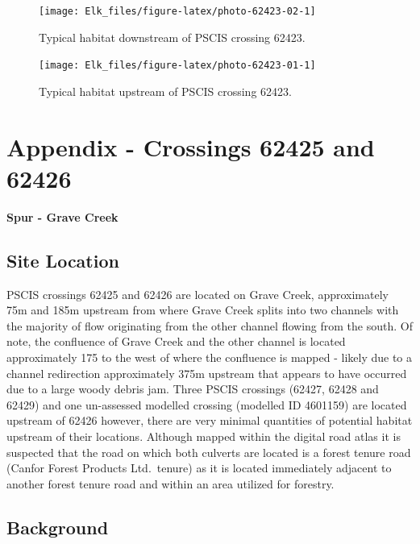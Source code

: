 \documentclass[
]{book}
\begin{document}
\begin{figure}[!ht]
\texttt{[image: Elk\_files/figure-latex/photo-62423-02-1]} \caption{Typical habitat downstream of PSCIS crossing 62423.}\label{fig:photo-62423-02}
\end{figure}

\begin{figure}[!ht]
\texttt{[image: Elk\_files/figure-latex/photo-62423-01-1]} \caption{Typical habitat upstream of PSCIS crossing 62423.}\label{fig:photo-62423-01}
\end{figure}

\hypertarget{appendix---crossings-62425-and-62426}{%
\chapter*{Appendix - Crossings 62425 and 62426}\label{appendix---crossings-62425-and-62426}}

\textbf{Spur - Grave Creek}

\hypertarget{site-location-4}{%
\section*{Site Location}\label{site-location-4}}

PSCIS crossings 62425 and 62426 are located on Grave Creek, approximately 75m and 185m upstream from where Grave Creek splits into two channels with the majority of flow originating from the other channel flowing from the south. Of note, the confluence of Grave Creek and the other channel is located approximately 175 to the west of where the confluence is mapped - likely due to a channel redirection approximately 375m upstream that appears to have occurred due to a large woody debris jam. Three PSCIS crossings (62427, 62428 and 62429) and one un-assessed modelled crossing (modelled ID 4601159) are located upstream of 62426 however, there are very minimal quantities of potential habitat upstream of their locations. Although mapped within the digital road atlas it is suspected that the road on which both culverts are located is a forest tenure road (Canfor Forest Products Ltd.~tenure) as it is located immediately adjacent to another forest tenure road and within an area utilized for forestry.

\hypertarget{background-5}{%
\section*{Background}\label{background-5}}
\end{document}
